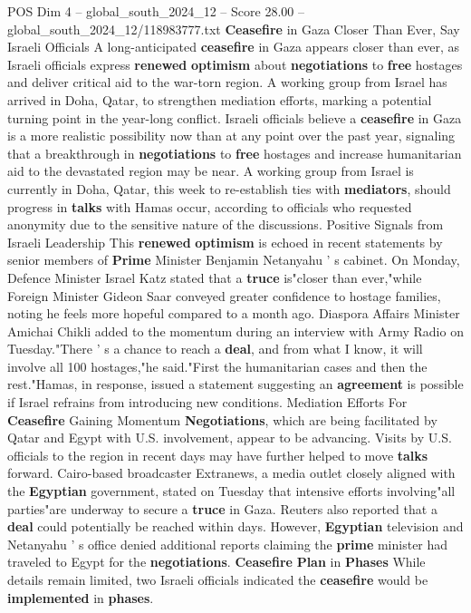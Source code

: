 \begin{textsample}{POS Dim 4 – global\_south\_2024\_12 – Score 28.00 – global\_south\_2024\_12/118983777.txt}  \label{ex:f4_pos_231}
\textbf{Ceasefire} in Gaza Closer Than Ever, Say Israeli Officials A long-anticipated \textbf{ceasefire} in Gaza appears closer than ever, as Israeli officials express \textbf{renewed} \textbf{optimism} about \textbf{negotiations} to \textbf{free} hostages and deliver critical aid to the war-torn region.
A working group from Israel has arrived in Doha, Qatar, to strengthen mediation efforts, marking a potential turning point in the year-long conflict.
Israeli officials believe a \textbf{ceasefire} in Gaza is a more realistic possibility now than at any point over the past year, signaling that a breakthrough in \textbf{negotiations} to \textbf{free} hostages and increase humanitarian aid to the devastated region may be near.
A working group from Israel is currently in Doha, Qatar, this week to re-establish ties with \textbf{mediators}, should progress in \textbf{talks} with Hamas occur, according to officials who requested anonymity due to the sensitive nature of the discussions.
Positive Signals from Israeli Leadership This \textbf{renewed} \textbf{optimism} is echoed in recent statements by senior members of \textbf{Prime} Minister Benjamin Netanyahu ' s cabinet.
On Monday, Defence Minister Israel Katz stated that a \textbf{truce} is"closer than ever,"while Foreign Minister Gideon Saar conveyed greater confidence to hostage families, noting he feels more hopeful compared to a month ago.
Diaspora Affairs Minister Amichai Chikli added to the momentum during an interview with Army Radio on Tuesday."There ' s a chance to reach a \textbf{deal}, and from what I know, it will involve all 100 hostages,"he said."First the humanitarian cases and then the rest."Hamas, in response, issued a statement suggesting an \textbf{agreement} is possible if Israel refrains from introducing new conditions.
Mediation Efforts For \textbf{Ceasefire} Gaining Momentum \textbf{Negotiations}, which are being facilitated by Qatar and Egypt with U.S. involvement, appear to be advancing.
Visits by U.S. officials to the region in recent days may have further helped to move \textbf{talks} forward.
Cairo-based broadcaster Extranews, a media outlet closely aligned with the \textbf{Egyptian} government, stated on Tuesday that intensive efforts involving"all parties"are underway to secure a \textbf{truce} in Gaza.
Reuters also reported that a \textbf{deal} could potentially be reached within days.
However, \textbf{Egyptian} television and Netanyahu ' s office denied additional reports claiming the \textbf{prime} minister had traveled to Egypt for the \textbf{negotiations}. \textbf{Ceasefire} \textbf{Plan} in \textbf{Phases} While details remain limited, two Israeli officials indicated the \textbf{ceasefire} would be \textbf{implemented} in \textbf{phases}.

\end{textsample}
